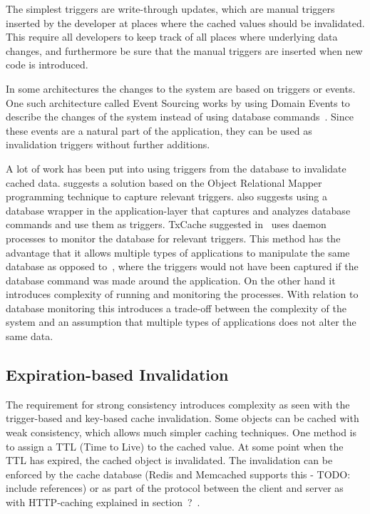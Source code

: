 The simplest triggers are write-through updates, which are manual triggers inserted by the developer at places where the cached values should be invalidated. This require all developers to keep track of all places where underlying data changes, and furthermore be sure that the manual triggers are inserted when new code is introduced.

In some architectures the changes to the system are based on triggers or events. One such architecture called Event Sourcing works by using Domain Events to describe the changes of the system instead of using database commands~\cite{blog:focusing_on_events}. Since these events are a natural part of the application, they can be used as invalidation triggers without further additions.

A lot of work has been put into using triggers from the database to invalidate cached data. \cite{paper:cache-genie} suggests a solution based on the Object Relational Mapper programming technique to capture relevant triggers. \cite{paper:deploy-time} also suggests using a database wrapper in the application-layer that captures and analyzes database commands and use them as triggers. TxCache suggested in~\cite{paper:liskov} uses daemon processes to monitor the database for relevant triggers. This method has the advantage that it allows multiple types of applications to manipulate the same database as opposed to~\cite{paper:cache-genie, paper-deploy-time}, where the triggers would not have been captured if the database command was made around the application. On the other hand it introduces complexity of running and monitoring the processes. With relation to database monitoring this introduces a trade-off between the complexity of the system and an assumption that multiple types of applications does not alter the same data.

\subsection{Expiration-based Invalidation}

The requirement for strong consistency introduces complexity as seen with the trigger-based and key-based cache invalidation. Some objects can be cached with weak consistency, which allows much simpler caching techniques. One method is to assign a TTL (Time to Live) to the cached value. At some point when the TTL has expired, the cached object is invalidated. The invalidation can be enforced by the cache database (Redis and Memcached supports this - TODO: include references) or as part of the protocol between the client and server as with HTTP-caching explained in section~?~\cite{paper:web_caching_schemes}.

